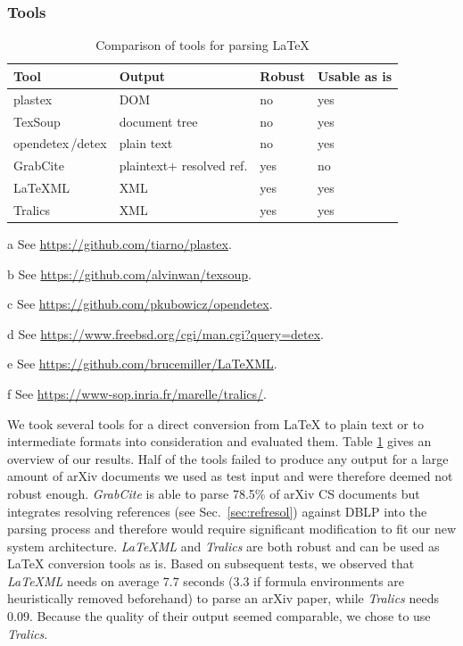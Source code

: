 \subsubsection{Tools}

\begin{table}[tb]
\centering
  \caption{Comparison of tools for parsing \LaTeX{}}
  \label{tbl:tools}
\begin{small}
\begin{threeparttable}
\begin{tabular}{llll}
\toprule
    Tool & Output & Robust & Usable as is \\
   \midrule
    plastex\tnote{a} & DOM & no & yes\\
    TexSoup\tnote{b} & document tree & no & yes\\
    opendetex\tnote{c}\,/detex\tnote{d} & plain text & no & yes\\
    GrabCite~\cite{Faerber2018LREC} & plain\hphantom{ }text\hphantom{ }+ resolved ref. & yes & no\\
    LaTeXML\tnote{e} & XML & yes & yes\\
    Tralics\tnote{f} & XML & yes & yes\\
  \bottomrule
\end{tabular}  \begin{tablenotes}
    \item[a] See \url{https://github.com/tiarno/plastex}.
    \item[b] See \url{https://github.com/alvinwan/texsoup}.
    \item[c] See \url{https://github.com/pkubowicz/opendetex}.
    \item[d] See \url{https://www.freebsd.org/cgi/man.cgi?query=detex}.
    \item[e] See \url{https://github.com/brucemiller/LaTeXML}.
    \item[f] See \url{https://www-sop.inria.fr/marelle/tralics/}.
  \end{tablenotes}
\end{threeparttable}
\end{small}
\end{table}

We took several tools for a direct conversion from \LaTeX{} to plain text or to intermediate formats into consideration and evaluated them. Table \ref{tbl:tools} gives an overview of our results. Half of the tools failed to produce any output for a large amount of arXiv documents we used as test input and were therefore deemed not robust enough. \textit{GrabCite} \cite{Faerber2018LREC} is able to parse 78.5\%
of arXiv CS documents but integrates resolving references (see Sec.~\ref{sec:refresol}) against DBLP into the parsing process and therefore would require significant modification to fit our new system architecture. \textit{LaTeXML} and \textit{Tralics} are both robust and can be used as \LaTeX{} conversion tools as is. Based on subsequent tests, we observed that \textit{LaTeXML} needs on average 7.7 seconds (3.3 if formula environments are heuristically removed beforehand) to parse an arXiv paper, while \textit{Tralics} needs 0.09. Because the quality of their output seemed comparable, we chose to use \textit{Tralics}.

